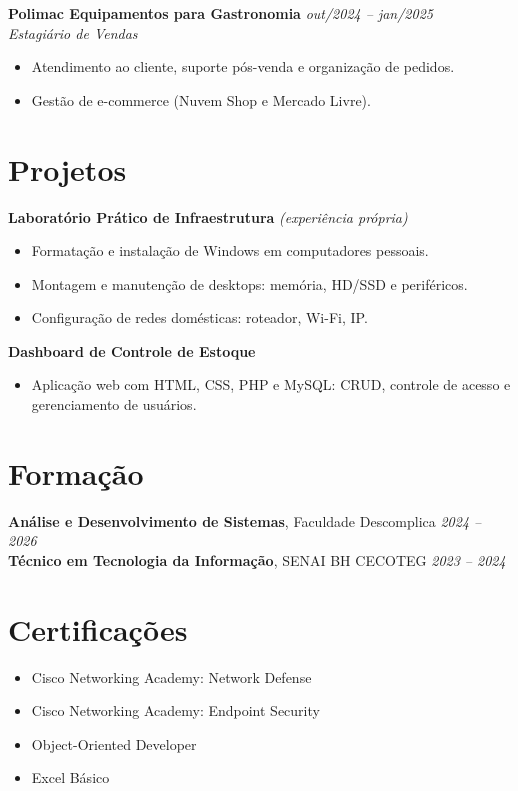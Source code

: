 \documentclass[11pt,a4paper]{article}
\begin{document}
\medskip

\textbf{Polimac Equipamentos para Gastronomia} \hfill \textit{out/2024 -- jan/2025}\\
\textit{Estagiário de Vendas}
\begin{itemize}
  \item Atendimento ao cliente, suporte pós-venda e organização de pedidos.
  \item Gestão de e-commerce (Nuvem Shop e Mercado Livre).
\end{itemize}

\section{Projetos}

\textbf{Laboratório Prático de Infraestrutura} \textit{(experiência própria)}
\begin{itemize}
  \item Formatação e instalação de Windows em computadores pessoais.
  \item Montagem e manutenção de desktops: memória, HD/SSD e periféricos.
  \item Configuração de redes domésticas: roteador, Wi-Fi, IP.
\end{itemize}

\medskip

\textbf{Dashboard de Controle de Estoque}
\begin{itemize}
  \item Aplicação web com HTML, CSS, PHP e MySQL: CRUD, controle de acesso e
        gerenciamento de usuários.
\end{itemize}

\section{Formação}

\textbf{Análise e Desenvolvimento de Sistemas}, Faculdade Descomplica \hfill \textit{2024 -- 2026}\\
\textbf{Técnico em Tecnologia da Informação}, SENAI BH CECOTEG \hfill \textit{2023 -- 2024}

\section{Certificações}
\begin{itemize}
  \item Cisco Networking Academy: Network Defense
  \item Cisco Networking Academy: Endpoint Security
  \item Object-Oriented Developer
  \item Excel Básico
\end{itemize}
\end{document}
